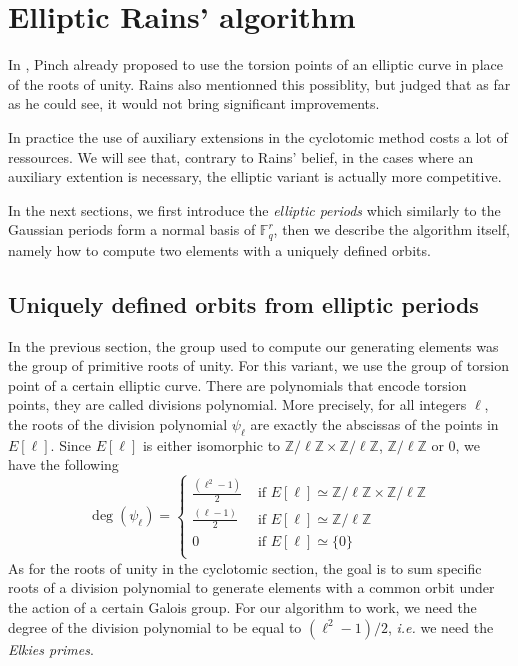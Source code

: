 \documentclass[12pt]{article}
\theoremstyle{plain}
\theoremstyle{definition}
\def\Z{\ensuremath{\mathbb{Z}}}
\def\F{\ensuremath{\mathbb{F}}}
\newcounter{algorithm}
\begin{document}

\section{Elliptic Rains' algorithm}
\label{sec:rains-elliptic}

In \cite{Pinch}, Pinch already proposed to use the torsion points of an elliptic
curve in place of the roots of unity. Rains also mentionned this possiblity, 
but judged that as far as he could see, it would not bring significant 
improvements.
 
In practice the use of auxiliary extensions in the cyclotomic method costs a
lot of ressources. We will see that, contrary to Rains' belief, in the cases 
where an auxiliary extention is necessary, the elliptic variant is actually more 
competitive.

In the next sections, we first introduce the \emph{elliptic periods} which
similarly to the Gaussian periods form a normal basis of $\F_q^r$, then we 
describe the algorithm itself, namely how to compute two elements with a
uniquely defined orbits.
 
\subsection{Uniquely defined orbits from elliptic periods}

In the previous section, the group used to compute our generating elements was
the group of primitive roots of unity. For this variant, we use the group of
torsion point of a certain elliptic curve. There are polynomials that encode 
torsion points, they are called divisions polynomial. More precisely, for
all integers $\ell$, the roots of the division polynomial $\psi_\ell$ are exactly the 
abscissas of the points in $E[\ell]$. Since $E[\ell]$ is either isomorphic to 
$\Z/\ell\Z\times\Z/\ell\Z$, $\Z/\ell\Z$ or $0$, we have the following
\begin{equation}
\deg(\psi_\ell) = \begin{cases}
   \tfrac{(\ell^2-1)}{2} &\text{ if }E[\ell]\simeq\Z/\ell\Z\times\Z/\ell\Z\\
   \tfrac{(\ell-1)}{2} &\text{ if }E[\ell]\simeq\Z/\ell\Z\\
   0 &\text{ if } E[\ell]\simeq\lbrace{0}\rbrace\\
\end{cases}
\end{equation}
As for the roots of unity in the cyclotomic section, the goal is to sum
specific roots of a division polynomial to generate elements with a common orbit
under the action of a certain Galois group. For our algorithm to work, we 
need the degree of the division polynomial to be equal to $(\ell^2 - 1)/2$,
\emph{i.e.} we need the \emph{Elkies primes}.
\end{document}
